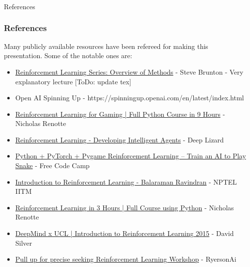 \begin{frame}[fragile]\frametitle{}
\begin{center}
{\Large References}
\end{center}
\end{frame}

\begin{frame}\frametitle{References}
Many publicly available resources have been refereed for making this presentation. Some of the notable ones are:
\footnotesize
\begin{itemize}
\item \href{https://www.youtube.com/watch?v=i7q8bISGwMQ}{Reinforcement Learning Series: Overview of Methods} - Steve Brunton - Very explanatory lecture [ToDo: update tex]
\item Open AI Spinning Up - https://spinningup.openai.com/en/latest/index.html
\item \href{https://www.youtube.com/watch?v=dWmJ5CXSKdw}{Reinforcement Learning for Gaming | Full Python Course in 9 Hours} - Nicholas Renotte
\item \href{https://www.youtube.com/playlist?list=PLZbbT5o_s2xoWNVdDudn51XM8lOuZ_Njv}{Reinforcement Learning - Developing Intelligent Agents} - Deep Lizard
\item \href{https://www.youtube.com/watch?v=L8ypSXwyBds}{Python + PyTorch + Pygame Reinforcement Learning – Train an AI to Play Snake} - Free Code Camp
\item \href{https://www.youtube.com/playlist?list=PLEAYkSg4uSQ0Hkv_1LHlJtC_wqwVu6RQX}{Introduction to Reinforcement Learning - Balaraman Ravindran} - NPTEL IITM
\item \href{https://www.youtube.com/watch?v=Mut_u40Sqz4}{Reinforcement Learning in 3 Hours | Full Course using Python} - Nicholas Renotte
\item \href{https://www.youtube.com/playlist?list=PLqYmG7hTraZDM-OYHWgPebj2MfCFzFObQ}{DeepMind x UCL | Introduction to Reinforcement Learning 2015} - David Silver
\item \href{https://www.youtube.com/watch?v=8GywDvor9mI}{Pull up for precise seeking Reinforcement Learning Workshop} - RyersonAi


\end{itemize}
\end{frame}
